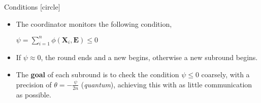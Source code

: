 \begin{frame}{Conditions}
    [circle]
    \begin{itemize}
        \item{The coordinator monitors the following condition,\\
        \begin{center}
            $\psi = \sum_{i=1}^n\phi(\pmb{X}_i,\pmb{E}) \leq 0$
        \end{center}
        }
        \vspace{0.3cm}
        \item{If $\psi\approx0$, the round ends and a new begins, otherwise a new subround begins.}
        \vspace{0.3cm}
        \item{The \textbf{goal} of each subround is to check the condition $\psi \leq 0$ coarsely, with a precision of $\theta = -\frac{\psi}{2n}$ (\emph{quantum}), achieving
        this with as little communication as possible.}
    \end{itemize}
\end{frame}